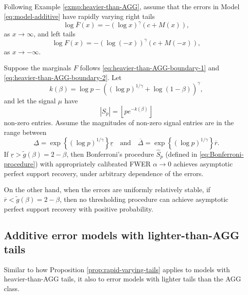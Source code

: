 Following Example \ref{exmp:heavier-than-AGG}, assume that the errors in Model \eqref{eq:model-additive} have rapidly varying right tails
\begin{equation} \label{eq:heavier-than-AGG-boundary-1}
    \log{\overline{F}(x)} = - \left(\log x\right)^\gamma \left(c+M(x)\right),
\end{equation}
as $x\to \infty$, and left tails
\begin{equation} \label{eq:heavier-than-AGG-boundary-2}
    \log{{F}(x)} = - \left(\log{(-x)}\right)^\gamma \left(c+M(-x)\right),
\end{equation}
as $x\to -\infty$.

\begin{theorem} \label{thm:heavier-than-AGG}
Suppose the marginals $F$ follows \eqref{eq:heavier-than-AGG-boundary-1} and \eqref{eq:heavier-than-AGG-boundary-2}.
Let
$$
k(\beta) = \log{p} - \left((\log{p})^{1/\gamma} + \log{(1-\beta)}\right)^\gamma,
$$
and let the signal $\mu$ have 
$$|S_p| = \left\lfloor pe^{-k(\beta)} \right\rfloor$$
non-zero entries. Assume the magnitudes of non-zero signal entries are in the range between
$$\underline{\Delta} = \exp{\left\{(\log{p})^{1/\gamma}\right\}}\underline{r}
\quad\text{and}\quad
\overline{\Delta} = \exp{\left\{(\log{p})^{1/\gamma}\right\}}\overline{r}.$$
If $\underline{r} > \widetilde{g}(\beta) = 2 - \beta$, then Bonferroni's procedure $\widehat{S}_p$ (defined in \eqref{eq:Bonferroni-procedure}) with appropriately calibrated FWER $\alpha\to 0$ achieves asymptotic perfect support recovery, under arbitrary dependence of the errors.

On the other hand, when the errors are uniformly relatively stable, if $\overline{r} < \widetilde{g}(\beta) = 2 - \beta$, then no thresholding procedure can achieve asymptotic perfect support recovery with positive probability.
\end{theorem}


\subsection{Additive error models with lighter-than-AGG tails}


Similar to how Proposition \ref{prop:rapid-varying-tails} applies to models with heavier-than-AGG tails, it also to error models with lighter tails than the AGG class.

